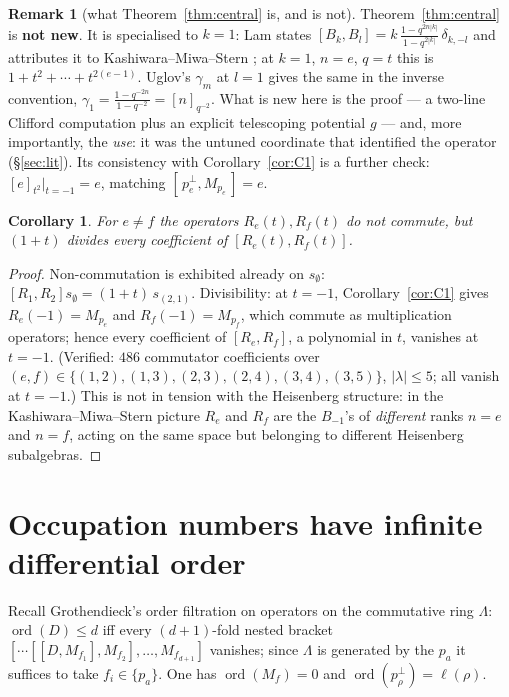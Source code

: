 \documentclass[11pt]{article}
\newtheorem{corollary}[theorem]{Corollary}
\theoremstyle{definition}
\newtheorem{remark}[theorem]{Remark}
\DeclareMathOperator{\ord}{ord}
\newcommand{\Lam}{\Lambda}
\newcommand{\Mult}[1]{M_{#1}}
\begin{document}
\begin{remark}[what Theorem~\ref{thm:central} is, and is not]
Theorem~\ref{thm:central} is \textbf{not new}.  It is
\cite[Cor.~\texttt{cor:KMS}, eq.~(\texttt{hei})]{Lam0409463} specialised to $k=1$:
Lam states $[B_k,B_l]=k\,\frac{1-q^{2n|k|}}{1-q^{2|k|}}\,\delta_{k,-l}$ and
attributes it to Kashiwara--Miwa--Stern \cite{KMS}; at $k=1$, $n=e$, $q=t$ this is
$1+t^{2}+\cdots+t^{2(e-1)}$.  Uglov's $\gamma_m$ at $l=1$
\cite[Prop.~\texttt{p:gamma}]{Uglov} gives the same in the inverse convention,
$\gamma_1=\frac{1-q^{-2n}}{1-q^{-2}}=[n]_{q^{-2}}$.  What is new here is the
proof --- a two-line Clifford computation plus an explicit telescoping potential
$g$ --- and, more importantly, the \emph{use}: it was the untuned coordinate that
identified the operator (\S\ref{sec:lit}).  Its consistency with
Corollary~\ref{cor:C1} is a further check: $[e]_{t^2}\big|_{t=-1}=e$, matching
$[\,p_e^{\perp},\Mult{p_e}\,]=e$.
\end{remark}

\begin{corollary}\label{cor:noncomm}
For $e\neq f$ the operators $R_e(t),R_f(t)$ do \emph{not} commute, but
$(1+t)$ divides every coefficient of $[R_e(t),R_f(t)]$.
\end{corollary}

\begin{proof}
Non-commutation is exhibited already on $s_\emptyset$: $[R_1,R_2]s_\emptyset=
(1+t)\,s_{(2,1)}$.  Divisibility: at $t=-1$, Corollary~\ref{cor:C1} gives
$R_e(-1)=\Mult{p_e}$ and $R_f(-1)=\Mult{p_f}$, which commute as multiplication
operators; hence every coefficient of $[R_e,R_f]$, a polynomial in $t$, vanishes at
$t=-1$.  (Verified: $486$ commutator coefficients over
$(e,f)\in\{(1,2),(1,3),(2,3),(2,4),(3,4),(3,5)\}$, $|\lambda|\le5$; all vanish at
$t=-1$.)  This is not in tension with the Heisenberg structure: in the
Kashiwara--Miwa--Stern picture $R_e$ and $R_f$ are the $B_{-1}$'s of \emph{different}
ranks $n=e$ and $n=f$, acting on the same space but belonging to different
Heisenberg subalgebras.
\end{proof}

\section{Occupation numbers have infinite differential order}

Recall Grothendieck's order filtration on operators on the commutative ring $\Lam$:
$\ord(D)\le d$ iff every $(d+1)$-fold nested bracket
$[\cdots[[D,\Mult{f_1}],\Mult{f_2}],\dots,\Mult{f_{d+1}}]$ vanishes; since $\Lam$ is
generated by the $p_a$ it suffices to take $f_i\in\{p_a\}$.  One has
$\ord(\Mult f)=0$ and $\ord(p_\rho^{\perp})=\ell(\rho)$.
\end{document}
